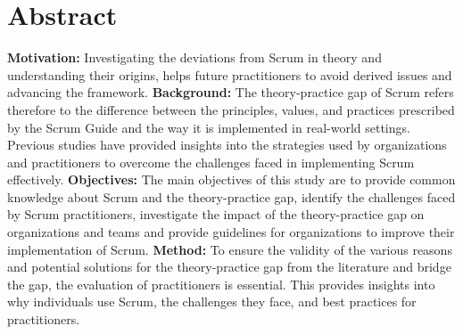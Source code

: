 %
\section*{Abstract}\label{cha:abstract}
\textbf{Motivation: }Investigating the deviations from Scrum in theory and understanding their origins, helps future
practitioners to avoid derived issues and advancing the framework.\newline
\textbf{Background: }The theory-practice gap of Scrum refers therefore to the difference between the principles, values, and practices prescribed by the Scrum Guide and the way it is implemented in real-world settings. Previous studies have provided insights into the strategies used by organizations and practitioners to overcome the challenges faced in implementing Scrum effectively.\newline
\textbf{Objectives: }The main objectives of this study are to provide common knowledge about Scrum and the theory-practice gap, identify the challenges faced by Scrum practitioners, investigate the impact of the theory-practice gap on organizations and teams and provide guidelines for organizations to improve their implementation of Scrum.\newline
\textbf{Method: }To ensure the validity of the various reasons and potential solutions for the theory-practice gap from the literature and bridge the gap, the evaluation of practitioners is essential. This provides insights into why individuals use Scrum, the challenges they face, and best practices for practitioners.\newline

